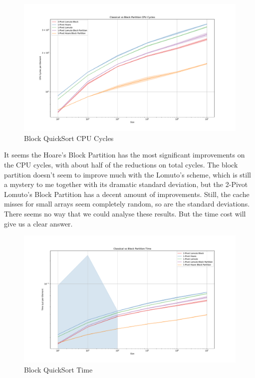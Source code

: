 \documentclass{article}
\begin{document}
\begin{figure}[H]
    \hypertarget{fig:blockcpucycles}{}
    \caption{Block QuickSort CPU Cycles}
    \centering
    \hspace*{-0.27\textwidth}
    \includegraphics[width=1.5\textwidth]{Classical vs Block Partition CPU Cycles.pdf}
\end{figure}

It seems the Hoare's Block Partition has the most significant improvements on the CPU cycles, with about half of the reductions on total cycles.
The block partition doesn't seem to improve much with the Lomuto's scheme, which is still a mystery to me together with its dramatic standard deviation, but the 2-Pivot Lomuto's Block Partition has a decent amount of improvements.
Still, the cache misses for small arrays seem completely random, so are the standard deviations. There seems no way that we could analyse these results. But the time cost will give us a clear answer.

\begin{figure}[H]
    \hypertarget{fig:blocktime}{}
    \caption{Block QuickSort Time}
    \centering
    \hspace*{-0.27\textwidth}
    \includegraphics[width=1.5\textwidth]{Classical vs Block Partition Time.pdf}
\end{figure}
\end{document}
